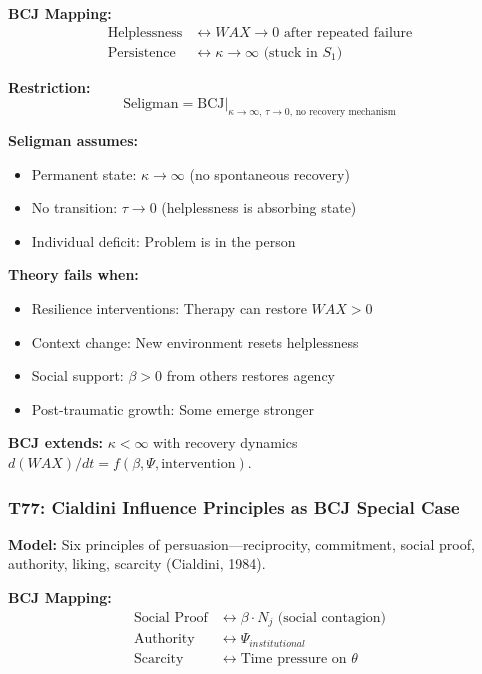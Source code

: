 \textbf{BCJ Mapping:}
\begin{align}
\text{Helplessness} &\leftrightarrow WAX \to 0 \text{ after repeated failure} \\
\text{Persistence} &\leftrightarrow \kappa \to \infty \text{ (stuck in } S_1 \text{)}
\end{align}

\textbf{Restriction:}
\begin{equation}
\text{Seligman} = \text{BCJ} \big|_{\kappa \to \infty, \, \tau \to 0, \, \text{no recovery mechanism}}
\end{equation}

\begin{tcolorbox}[colback=red!5!white, colframe=red!75!black,
    title=Boundary Condition: Where Seligman Fails]
\textbf{Seligman assumes:}
\begin{itemize}[nosep]
\item Permanent state: $\kappa \to \infty$ (no spontaneous recovery)
\item No transition: $\tau \to 0$ (helplessness is absorbing state)
\item Individual deficit: Problem is in the person
\end{itemize}

\textbf{Theory fails when:}
\begin{itemize}[nosep]
\item Resilience interventions: Therapy can restore $WAX > 0$
\item Context change: New environment resets helplessness
\item Social support: $\beta > 0$ from others restores agency
\item Post-traumatic growth: Some emerge stronger
\end{itemize}

\textbf{BCJ extends:} $\kappa < \infty$ with recovery dynamics $d(WAX)/dt = f(\beta, \Psi, \text{intervention})$.
\end{tcolorbox}

\subsubsection*{T77: Cialdini Influence Principles as BCJ Special Case}

\textbf{Model:} Six principles of persuasion---reciprocity, commitment, social proof, authority, liking, scarcity (Cialdini, 1984).

\textbf{BCJ Mapping:}
\begin{align}
\text{Social Proof} &\leftrightarrow \beta \cdot N_j \text{ (social contagion)} \\
\text{Authority} &\leftrightarrow \Psi_{institutional} \\
\text{Scarcity} &\leftrightarrow \text{Time pressure on } \theta
\end{align}

